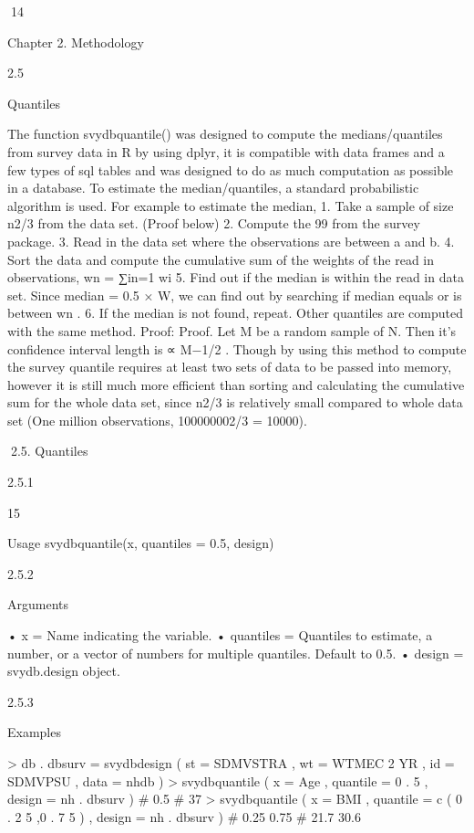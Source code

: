 14

Chapter 2. Methodology

2.5

Quantiles

The function svydbquantile() was designed to compute the medians/quantiles
from survey data in R by using dplyr, it is compatible with data frames and a few
types of sql tables and was designed to do as much computation as possible in a
database.
To estimate the median/quantiles, a standard probabilistic algorithm is used. For
example to estimate the median,
1. Take a sample of size n2/3 from the data set. (Proof below)
2. Compute the 99%
from the survey package.
3. Read in the data set where the observations are between a and b.
4. Sort the data and compute the cumulative sum of the weights of the read in
observations, wn = ∑in=1 wi
5. Find out if the median is within the read in data set. Since median = 0.5 × W,
we can find out by searching if median equals or is between wn .
6. If the median is not found, repeat.
Other quantiles are computed with the same method.
Proof:
Proof. Let M be a random sample of N.
Then it’s confidence interval length is ∝ M−1/2 .
Though by using this method to compute the survey quantile requires at least
two sets of data to be passed into memory, however it is still much more efficient
than sorting and calculating the cumulative sum for the whole data set, since n2/3 is
relatively small compared to whole data set (One million observations, 100000002/3 =
10000).

2.5. Quantiles

2.5.1

15

Usage
svydbquantile(x, quantiles = 0.5, design)

2.5.2

Arguments

• x = Name indicating the variable.
• quantiles = Quantiles to estimate, a number, or a vector of numbers for multiple
quantiles. Default to 0.5.
• design = svydb.design object.

2.5.3

Examples

> db . dbsurv = svydbdesign ( st = SDMVSTRA , wt = WTMEC 2 YR ,
id = SDMVPSU , data = nhdb )
> svydbquantile ( x = Age , quantile = 0 . 5 , design = nh . dbsurv )
# 0.5
# 37
> svydbquantile ( x = BMI , quantile = c ( 0 . 2 5 ,0 . 7 5 ) ,
design = nh . dbsurv )
# 0.25 0.75
# 21.7 30.6

